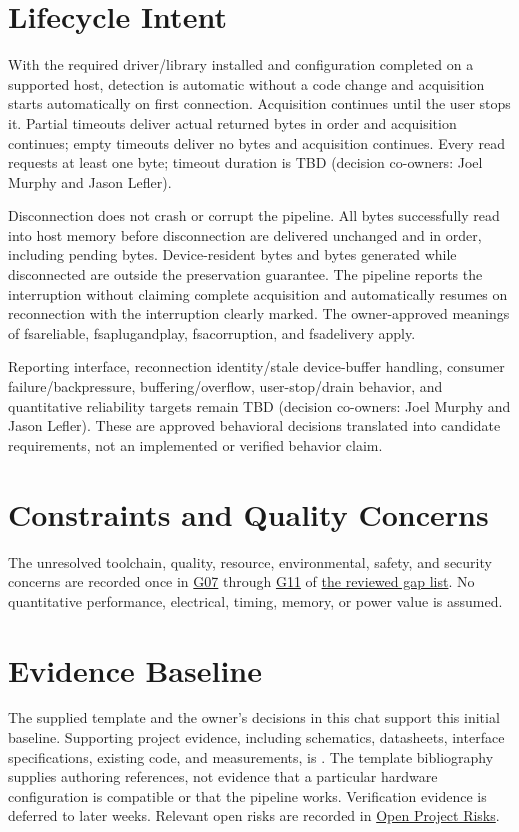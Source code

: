 \section{Lifecycle Intent}
\label{Section:ProjectLifecycleIntent}
With the required driver/library installed and configuration completed on a
supported host, detection is automatic without a code change and acquisition
starts automatically on first connection. Acquisition continues until the
user stops it. Partial timeouts deliver actual returned bytes in order and
acquisition continues; empty timeouts deliver no bytes and acquisition
continues. Every read requests at least one byte; timeout duration is TBD
(decision co-owners: Joel Murphy and Jason Lefler).

Disconnection does not crash or corrupt the pipeline. All bytes successfully
read into host memory before disconnection are delivered unchanged and in
order, including pending bytes. Device-resident bytes and bytes generated
while disconnected are outside the preservation guarantee. The pipeline
reports the interruption without claiming complete acquisition and
automatically resumes on reconnection with the interruption clearly marked.
The owner-approved meanings of \gls{fsareliable}, \gls{fsaplugandplay},
\gls{fsacorruption}, and \gls{fsadelivery} apply.

Reporting interface, reconnection identity/stale device-buffer handling,
consumer failure/backpressure, buffering/overflow, user-stop/drain behavior,
and quantitative reliability targets remain TBD (decision co-owners: Joel Murphy and Jason Lefler).
These are approved behavioral decisions translated into candidate
requirements, not an implemented or verified behavior claim.

\section{Constraints and Quality Concerns}
\label{Section:ProjectConstraints}
The unresolved toolchain, quality, resource, environmental, safety, and
security concerns are recorded once in
\hyperref[Gap:G07]{G07} through \hyperref[Gap:G11]{G11} of
\hyperref[Table:ProjectGapReview]{the reviewed gap list}. No quantitative
performance, electrical, timing, memory, or power value is assumed.

\section{Evidence Baseline}
\label{Section:ProjectEvidenceBaseline}
The supplied template and the owner's decisions in this chat support this
initial baseline. Supporting project evidence, including schematics,
datasheets, interface specifications, existing code, and measurements, is \OwnedTBD{}.
The template bibliography supplies authoring references, not evidence that a
particular hardware configuration is compatible or that the pipeline works.
Verification evidence is deferred to later weeks. Relevant open risks are
recorded in \hyperref[Table:ProjectOpenRisks]{Open Project Risks}.
